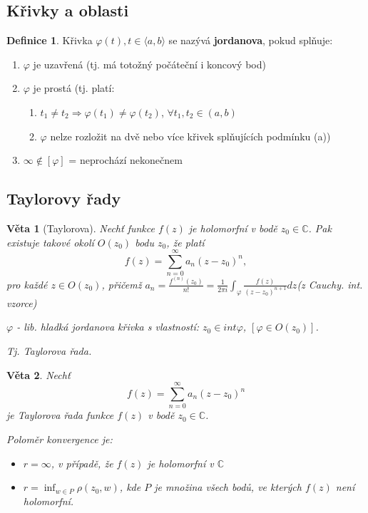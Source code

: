 \documentclass[a4]{report}
\newtheorem{theorem}{Věta}
\theoremstyle{definition}
\newtheorem{definition}{Definice}[section]
\begin{document}
\subsection{Křivky a oblasti}
\begin{definition}
Křivka $\varphi(t), t\in\langle a,b\rangle$ se nazývá \textbf{jordanova}, pokud splňuje:
\begin{enumerate}
\item $\varphi$ je uzavřená (tj. má totožný počáteční i koncový bod)
\item $\varphi$ je prostá (tj. platí: 
\begin{enumerate}
\item $t_1\neq t_2 \Rightarrow\varphi(t_1)\neq\varphi(t_2)$, $\forall t_1,t_2\in(a,b)$
\item $\varphi$ nelze rozložit na dvě nebo více křivek splňujících podmínku (a))
\end{enumerate}
\item $\infty\notin[\varphi]$ = neprochází nekonečnem
\end{enumerate}
\end{definition}

\subsection{Taylorovy řady}
\begin{theorem}[Taylorova]
Nechť funkce $f(z)$ je holomorfní v bodě $z_0\in\mathbb{C}$. Pak  existuje takové okolí $O(z_0)$ bodu $z_0$, že platí $$f(z)=\sum_{n=0}^\infty a_n(z-z_0)^n,$$ pro každé  $ z\in O(z_0)$, přičemž  $a_n=\frac{f^{(n)}(z_0)}{n!}=\frac{1}{2\pi i}\int_{\varphi}\frac{f(z)}{(z-z_0)^{n+1}}dz$(z Cauchy. int. vzorce)

$\varphi$ - lib. hladká jordanova křivka s vlastností: $z_0\in int\varphi$, $[\varphi\in O(z_0)]$.

Tj. Taylorova řada.
\end{theorem}

\begin{theorem}
Nechť $$f(z)=\sum_{n=0}^{\infty}a_n(z-z_0)^n$$ je Taylorova řada funkce $f(z)$ v bodě $z_0\in\mathbb{C}$. 

Poloměr konvergence je: 
\begin{itemize}
\item $r=\infty$, v případě, že $f(z)$ je holomorfní v $\mathbb{C}$
\item $r=\inf_{w\in P}\rho(z_0,w)$, kde $P$ je množina všech bodů, ve kterých $f(z)$ není holomorfní.
\end{itemize}
\end{theorem}
\end{document}
